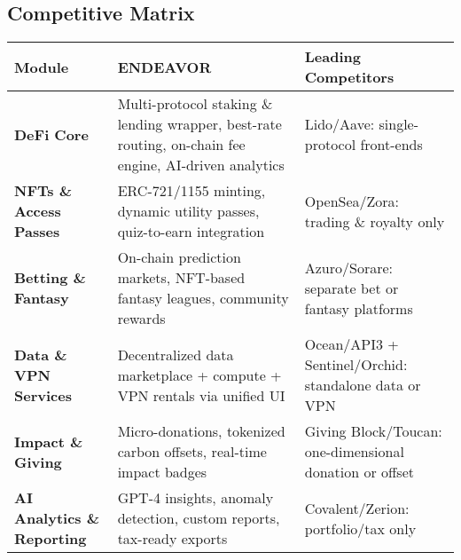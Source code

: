 \documentclass[13pt]{extarticle}
\begin{document}
\subsection{Competitive Matrix}
\begin{center}
\begin{tabular}{>{\bfseries}p{4cm} p{5cm} p{5cm}}
  \toprule
  \textbf{Module} & \textbf{ENDEAVOR} & \textbf{Leading Competitors} \\
  \midrule
  DeFi Core
    & Multi-protocol staking \& lending wrapper, best-rate routing, on-chain fee engine, AI-driven analytics
    & Lido/Aave: single-protocol front-ends \\
  NFTs \& Access Passes
    & ERC-721/1155 minting, dynamic utility passes, quiz-to-earn integration
    & OpenSea/Zora: trading \& royalty only \\
  Betting \& Fantasy
    & On-chain prediction markets, NFT-based fantasy leagues, community rewards
    & Azuro/Sorare: separate bet or fantasy platforms \\
  Data \& VPN Services
    & Decentralized data marketplace + compute + VPN rentals via unified UI
    & Ocean/API3 + Sentinel/Orchid: standalone data or VPN \\
  Impact \& Giving
    & Micro-donations, tokenized carbon offsets, real-time impact badges
    & Giving Block/Toucan: one-dimensional donation or offset \\
  AI Analytics \& Reporting
    & GPT-4 insights, anomaly detection, custom reports, tax-ready exports
    & Covalent/Zerion: portfolio/tax only \\
  \bottomrule
\end{tabular}
\end{center}

\vspace{1cm}
\end{document}
